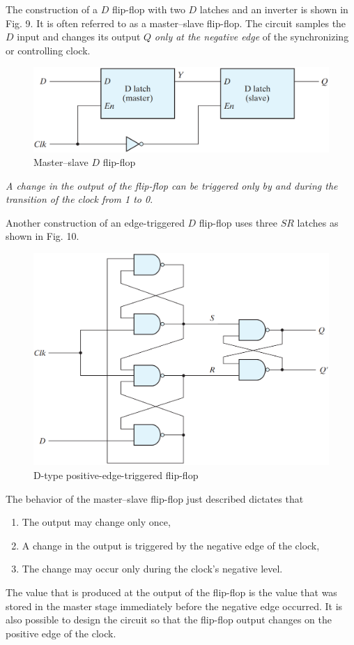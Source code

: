 The construction of a $D$ flip-flop with two $D$ latches and an inverter is shown in Fig. 9. It is often referred to as a master–slave flip-flop. The circuit samples the $D$ input and changes its output $Q$ \textit{only at the negative edge} of the synchronizing or controlling clock.
\begin{figure}[H]
  \centering
  \includegraphics[width=\linewidth]{img/fig-5.9.png}
  \caption{Master–slave $D$ flip-flop}
  \label{fig:5.9}
\end{figure}
\noindent \textit{A change in the output of the flip-flop can be triggered only by and during the transition of the clock from 1 to 0}.

Another construction of an edge-triggered $D$ flip-flop uses three $SR$ latches as shown in Fig. 10.
\begin{figure}[H]
  \centering
  \includegraphics[width=\linewidth]{img/fig-5.10.png}
  \caption{D-type positive-edge-triggered flip-flop}
  \label{fig:5.10}
\end{figure}

The behavior of the master–slave flip-flop just described dictates that
\begin{enumerate}[leftmargin=0.5cm]
  \item The output may change only once,
  \item A change in the output is triggered by the negative edge of the clock,
  \item The change may occur only during the clock's negative level.
\end{enumerate}
\noindent The value that is produced at the output of the flip-flop is the value that was stored in the master stage immediately before the negative edge occurred. It is also possible to design the circuit so that the flip-flop output changes on the positive edge of the clock.

